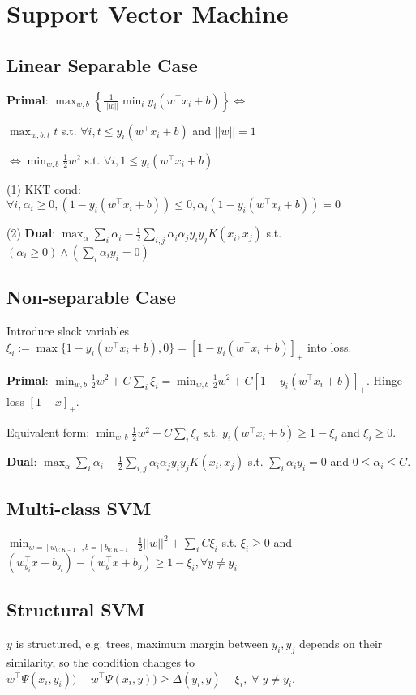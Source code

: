 \section{Support Vector Machine}
\subsection*{Linear Separable Case}
\textbf{Primal}: $\max_{w,b} \left\{\frac{1}{||w||} \min_{i}  y_{i}(w^{\top}x_{i}+b)\right\} \Leftrightarrow$

$\max_{w,b,t} t$ s.t. $\forall i,t\leq y_{i}(w^{\top}x_{i}+b)$ and $||w|| = 1$

$\Leftrightarrow \min_{w,b} \frac{1}{2} w^2$ s.t. $\forall i,1 \leq y_{i}(w^{\top}x_{i}+b)$ 

(1) KKT cond: $\forall i, \alpha_i \geq 0, (1-y_{i}(w^{\top}x_{i}+b))\leq 0, \alpha_{i}(1-y_{i}(w^{\top}x_{i}+b)) = 0$

(2) \textbf{Dual}: $\max_{\alpha} \sum_{i} \alpha_{i} - \frac{1}{2}\sum_{i,j}\alpha_{i} \alpha_{j} y_{i} y_{j} K(x_{i},x_{j})$ s.t. $(\alpha_i \geq 0)\land (\sum_{i} \alpha_{i} y_{i} = 0)$

\subsection*{Non-separable Case}
Introduce slack variables $\xi_i := \max \{1 - y_i(w^{\top}x_i + b), 0\} = [1 - y_i(w^{\top}x_i + b)]_{+}$ into loss. 

\textbf{Primal}: $\min_{w,b} \frac{1}{2} w^2 + C\sum_i\xi_i = \min_{w,b} \frac{1}{2} w^2 + C[1 - y_i(w^{\top}x_i + b)]_{+}$.  Hinge loss $[1-x]_{+}$.

Equivalent form: $\min_{w,b} \frac{1}{2} w^2 + C\sum_i\xi_i$ s.t. $ y_i(w^{\top}x_i + b) \geq 1-\xi_i$ and $\xi_i \geq 0$.

\textbf{Dual}: $\max_{\alpha} \sum_{i} \alpha_{i} - \frac{1}{2}\sum_{i,j}\alpha_{i} \alpha_{j} y_{i} y_{j} K(x_i, x_j)$ s.t. $\sum_i \alpha_i y_i=0 $ and $0\leq \alpha_i \leq C$.


\subsection*{Multi-class SVM}
$\min_{w=[w_{0:K-1}],b=[b_{0:K-1}]} \frac{1}{2} ||w||^2 + \sum_i C\xi_i$ s.t. $\xi_i\geq 0$ and $(w_{y_i}^{\top} x +b_{y_i}) - (w_{y}^{\top}x + b_{y}) \geq 1 -\xi_i, \forall y\neq y_i$

\subsection*{Structural SVM}
$y$ is structured, e.g. trees, maximum margin between $y_i,y_j$ depends on their similarity, so the condition changes to $w^{\top}\Psi(x_i,y_i)) - w^{\top}\Psi(x_i,y)) \geq \Delta(y_i,y) -\xi_i,\;\forall\;y\neq y_i$.

